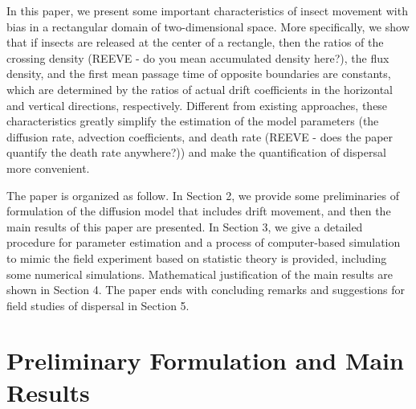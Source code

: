 \documentclass[11pt]{article}
\begin{document}
In this paper, we present some important characteristics of insect movement with bias in a rectangular domain of two-dimensional space. More specifically, we show that if insects are released at the center of a rectangle, then the ratios of the crossing density (REEVE - do you mean accumulated density here?), the flux density, and the first mean passage time of opposite boundaries are constants, which are determined by the ratios of actual drift coefficients in the horizontal and vertical directions, respectively. Different from existing approaches, these characteristics greatly simplify the estimation of the model parameters (the diffusion rate, advection coefficients, and death rate (REEVE - does the paper quantify the death rate anywhere?)) and make the quantification of dispersal more convenient.  

The paper is organized as follow. In Section 2, we provide some preliminaries of formulation of the diffusion model that includes drift movement, and then the main results of this paper are presented. In Section 3, we give a detailed procedure for parameter estimation and a process of computer-based simulation to mimic the field experiment based on statistic theory is provided, including some numerical simulations. Mathematical justification of the main results are shown in Section 4. The paper ends with concluding remarks and suggestions for field studies of dispersal in Section 5. 

\section{Preliminary Formulation and Main Results}
\end{document}
